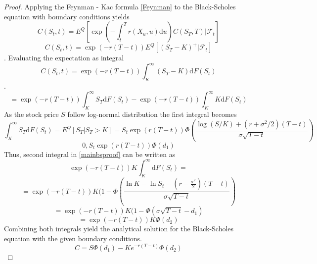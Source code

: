 \documentclass[12pt, oneside]{book}
\theoremstyle{plain}
\theoremstyle{definition}
\begin{document}
\begin{proof}
Applying the Feynman - Kac formula \ref{Feynman} to the Black-Scholes equation with boundary conditions yields
\begin{equation}
C(S_t, t) = E^Q [ \exp(-  \int_{t}^{T} r(X_u, u)  \mathrm{d}u) C(S_T, T) \lvert \mathcal{F}_t]
\end{equation}
\begin{equation}
C(S_t, t) = \exp(-r (T-t))  E^Q [(S_T - K)^+ \lvert \mathcal{F}_t]
\end{equation}.
Evaluating the expectation as integral
\begin{equation}
C(S_t, t) = \exp(-r (T-t))  \int_K^{\infty} (S_T - K) \mathrm{d}F(S_t)
\end{equation}.
\begin{equation}\label{mainbsproof}
 = \exp(-r (T-t))  \int_K^{\infty} S_T \mathrm{d}F(S_t) - \exp(-r (T-t))  \int_K^{\infty} K \mathrm{d}F(S_t)
\end{equation}
 As the stock price $S$ follow log-normal distribution \cite{hull} the first integral becomes
 \begin{equation}
 \int_K^{\infty} S_T \mathrm{d}F(S_t)  = E^Q[S_T \lvert S_T > K] = S_t \exp(r(T-t)) \Phi( \frac{\log(S/K) + (r + \sigma^2/2)(T - t)}{\sigma \sqrt{T-t}}) 
 \end{equation}
  \begin{equation}
0, S_t \exp(r(T-t)) \Phi(d_1) 
 \end{equation}
Thus, second integral in \ref{mainbsproof} can be written as
\begin{equation}
\exp(-r (T-t))  K \int_K^{\infty} \mathrm{d}F(S_t) =
\end{equation}
\begin{equation}
= \exp(-r (T-t))  K (1 - \Phi(\frac{\ln K - \ln S_t - (r - \frac{\sigma^2}{2})(T- t)}{\sigma \sqrt{T - t}})
\end{equation}
\begin{equation}
= \exp(-r (T-t))  K (1 - \Phi( \sigma \sqrt{T-t} - d_1) 
\end{equation}
\begin{equation}
= \exp(-r (T-t))  K \Phi(d_2) 
\end{equation}
Combining both integrals yield the analytical solution for the Black-Scholes equation with the given boundary conditions.
\begin{equation}
C = S \Phi (d_1) - K e^{-r(T-t)} \Phi (d_2)
\end{equation}
\end{proof}
\end{document}
